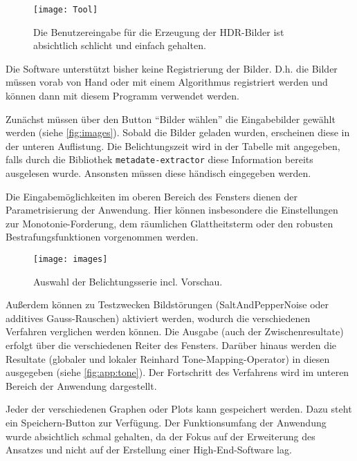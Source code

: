 \begin{figure}
  \begin{center}
    \texttt{[image: Tool]}
    \caption{Die Benutzereingabe für die Erzeugung der HDR-Bilder ist absichtlich schlicht und einfach gehalten.}
    \label{fig:tool}
  \end{center}
\end{figure}

Die Software unterstützt bisher keine Registrierung der Bilder. D.h. die Bilder müssen vorab von Hand oder mit einem Algorithmus registriert werden und können dann mit diesem Programm verwendet werden.

Zunächst müssen über den Button \enquote{Bilder wählen} die Eingabebilder gewählt werden (siehe \autoref{fig:images}). Sobald die Bilder geladen wurden, erscheinen diese in der unteren Auflistung. Die Belichtungszeit wird in der Tabelle mit angegeben, falls durch die Bibliothek \texttt{metadate-extractor} diese Information bereits ausgelesen wurde. Ansonsten müssen diese händisch eingegeben werden.

Die Eingabemöglichkeiten im oberen Bereich des Fensters dienen der Parametrisierung  der Anwendung. Hier können insbesondere die Einstellungen zur Monotonie-Forderung, dem räumlichen Glattheitsterm oder den robusten Bestrafungsfunktionen vorgenommen werden.

\begin{figure}
  \begin{center}
    \texttt{[image: images]}
    \caption{Auswahl der Belichtungsserie incl. Vorschau.}
    \label{fig:images}
  \end{center}
\end{figure}

Außerdem können zu Testzwecken Bildstörungen (\gls{SaltAndPepperNoise} oder additives Gauss-Rauschen) aktiviert werden, wodurch die verschiedenen Verfahren verglichen werden können. Die Ausgabe (auch der Zwischenresultate) erfolgt über die verschiedenen Reiter des Fensters. Darüber hinaus werden die Resultate (globaler und lokaler Reinhard \gls{Tone-Mapping}-Operator) in diesen ausgegeben (siehe \autoref{fig:app:tone}). Der Fortschritt des Verfahrens wird im unteren Bereich der Anwendung dargestellt.

Jeder der verschiedenen Graphen oder Plots kann gespeichert werden. Dazu steht ein Speichern-Button zur Verfügung. 
Der Funktionsumfang der Anwendung wurde absichtlich schmal gehalten, da der Fokus auf der Erweiterung des Ansatzes und nicht auf der Erstellung einer High-End-Software lag.

